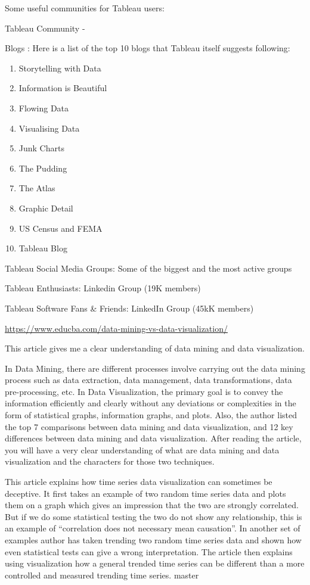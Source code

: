 \documentclass[]{book}
\providecommand{\tightlist}{%
  \setlength{\itemsep}{0pt}\setlength{\parskip}{0pt}}
\theoremstyle{definition}
\theoremstyle{definition}
\theoremstyle{definition}
\theoremstyle{remark}
\begin{document}
Some useful communities for Tableau users:

Tableau Community - \citep{Tableau_Community}

Blogs : Here is a list of the top 10 blogs that Tableau itself suggests
following:

\citep{Top_10_Blogs}

\begin{enumerate}
\def\labelenumi{\arabic{enumi}.}
\tightlist
\item
  Storytelling with Data
\item
  Information is Beautiful
\item
  Flowing Data
\item
  Visualising Data
\item
  Junk Charts
\item
  The Pudding
\item
  The Atlas
\item
  Graphic Detail
\item
  US Census and FEMA
\item
  Tableau Blog
\end{enumerate}

Tableau Social Media Groups: Some of the biggest and the most active
groups

Tableau Enthusiasts: Linkedin Group (19K members)

Tableau Software Fans \& Friends: LinkedIn Group (45kK members)

\citep{LinkedIn_Groups}

\url{https://www.educba.com/data-mining-vs-data-visualization/}

This article gives me a clear understanding of data mining and data
visualization.

In Data Mining, there are different processes involve carrying out the
data mining process such as data extraction, data management, data
transformations, data pre-processing, etc. In Data Visualization, the
primary goal is to convey the information efficiently and clearly
without any deviations or complexities in the form of statistical
graphs, information graphs, and plots. Also, the author listed the top 7
comparisons between data mining and data visualization, and 12 key
differences between data mining and data visualization. After reading
the article, you will have a very clear understanding of what are data
mining and data visualization and the characters for those two
techniques.

This article explains how time series data visualization can sometimes
be deceptive. It first takes an example of two random time series data
and plots them on a graph which gives an impression that the two are
strongly correlated. But if we do some statistical testing the two do
not show any relationship, this is an example of ``correlation does not
necessary mean causation''. In another set of examples author has taken
trending two random time series data and shown how even statistical
tests can give a wrong interpretation. The article then explains using
visualization how a general trended time series can be different than a
more controlled and measured trending time series. master
\end{document}

